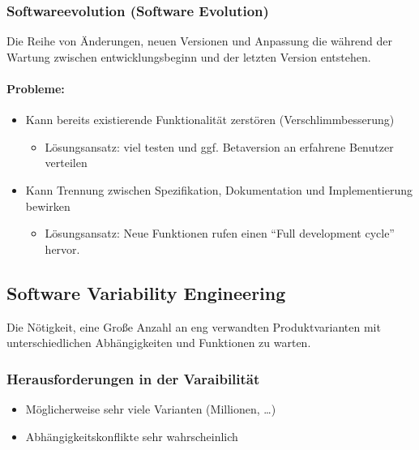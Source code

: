 \documentclass[
    ngerman,
    color=3b,
    summary,
    boxarc,
    main,
]{rubos-tuda-template}
\begin{document}
\subsubsection{Softwareevolution (Software Evolution)}
\begin{definition}[Softwareevolution]
    Die Reihe von Änderungen, neuen Versionen und Anpassung die während der Wartung zwischen entwicklungsbeginn und der letzten Version entstehen.
\end{definition}
\paragraph{Probleme:}\begin{itemize}
    \item Kann bereits existierende Funktionalität zerstören (Verschlimmbesserung)\begin{itemize}
              \item Lösungsansatz: viel testen und ggf. Betaversion an erfahrene Benutzer verteilen
          \end{itemize}
    \item Kann Trennung zwischen Spezifikation, Dokumentation und Implementierung bewirken\begin{itemize}
              \item Lösungsansatz: Neue Funktionen rufen einen \enquote{Full development cycle} hervor.
          \end{itemize}
\end{itemize}
\subsection{Software Variability Engineering}
\begin{definition}
    Die Nötigkeit, eine Große Anzahl an eng verwandten Produktvarianten mit unterschiedlichen Abhängigkeiten und Funktionen zu warten.
\end{definition}

\subsubsection{Herausforderungen in der Varaibilität}\begin{itemize}
    \item Möglicherweise sehr viele Varianten (Millionen, \dots)
    \item Abhängigkeitskonflikte sehr wahrscheinlich
\end{itemize}
\end{document}
